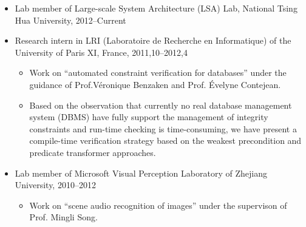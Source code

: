 \documentclass[letterpaper]{article}
\begin{document}
\begin{itemize}
\item Lab member of Large-scale System Architecture (LSA) Lab, National Tsing Hua University, 2012--Current
\item Research intern in LRI (Laboratoire de Recherche en Informatique) of the University of Paris XI, France, 2011,10--2012,4
    \begin{itemize}
	  \item Work on ``automated constraint verification for databases'' under the guidance of Prof.V\'eronique Benzaken and Prof. \'Evelyne Contejean.
	  \item Based on the observation that currently no real database management system (DBMS) have fully support the management of integrity constraints and run-time checking is time-consuming, we have present a compile-time verification strategy based on the weakest precondition and predicate transformer approaches.
    \end{itemize} 
\item Lab member of Microsoft Visual Perception Laboratory of Zhejiang University, 2010--2012
    \begin{itemize}
	  \item Work on ``scene audio recognition of images'' under the supervison of Prof. Mingli Song. 



\end{itemize}
\end{itemize}
\end{document}
